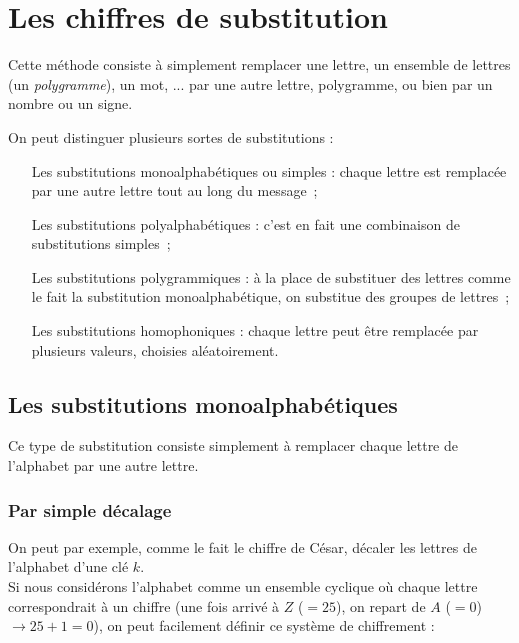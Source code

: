 \section{Les chiffres de substitution}
Cette méthode consiste à simplement remplacer une lettre, un ensemble
de lettres (un \emph{polygramme}), un mot, ...  par une autre lettre,
polygramme, ou bien par un nombre ou un signe.

On peut distinguer plusieurs sortes de substitutions : 
\begin{itemize}
  \renewcommand{\makelabel}[1]{\sffamily\textbf{#1}}
  \item[Les substitutions monoalphabétiques ou simples] : 
    chaque lettre est remplacée par une autre lettre tout au long du message~; 
  \item[Les substitutions polyalphabétiques] :
    c'est en fait une combinaison de substitutions simples~;
  \item[Les substitutions polygrammiques]: 
    à la place de substituer des lettres comme le fait la substitution
    monoalphabétique, on substitue des groupes de lettres~;
  \item[Les substitutions homophoniques] : 
    chaque lettre peut être remplacée par plusieurs valeurs, choisies
    aléatoirement.
\end{itemize}


\subsection{Les substitutions monoalphabétiques}
Ce type de substitution consiste simplement à remplacer chaque lettre
de l'alphabet par une autre lettre.

\subsubsection{Par simple décalage}
On peut par exemple, comme le fait le chiffre de
César, décaler les lettres de l'alphabet d'une
clé $k$. \\

 Si nous considérons l'alphabet comme un ensemble cyclique où 
chaque lettre correspondrait à un chiffre (une fois arrivé à $Z$ ($= 25$), on 
repart de $A$ ($= 0$) $\rightarrow 25 + 1 = 0$), on peut facilement définir 
ce système de chiffrement :  \\

